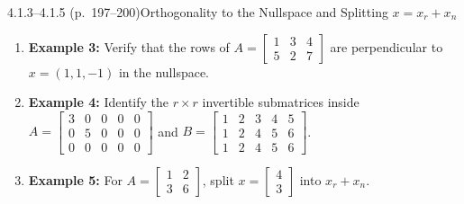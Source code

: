 \documentclass[11pt,a4paper,openany,oneside]{book}
\def\vect#1{#1}%
\def\mathbf#1{#1}%
\newcommand{\vect}[1]{\mathbf{#1}}
\numberwithin{equation}{chapter}
\begin{document}
\begin{example}{4.1.3--4.1.5 (p.\ 197--200)}{Orthogonality to the Nullspace and Splitting $\vect{x} = \vect{x}_r + \vect{x}_n$}
\begin{enumerate}
\item \textbf{Example 3:} Verify that the rows of $A = \begin{bmatrix}1 & 3 & 4\\5 & 2 & 7\end{bmatrix}$ are perpendicular to $\vect{x} = (1,1,-1)$ in the nullspace.
\item \textbf{Example 4:} Identify the $r \times r$ invertible submatrices inside $A = \begin{bmatrix}3&0&0&0&0\\0&5&0&0&0\\0&0&0&0&0\end{bmatrix}$ and $B = \begin{bmatrix}1&2&3&4&5\\1&2&4&5&6\\1&2&4&5&6\end{bmatrix}$.
\item \textbf{Example 5:} For $A = \begin{bmatrix}1 & 2\\3 & 6\end{bmatrix}$, split $\vect{x} = \begin{bmatrix}4\\3\end{bmatrix}$ into $\vect{x}_r + \vect{x}_n$.
\end{enumerate}
\end{example}
\end{document}
